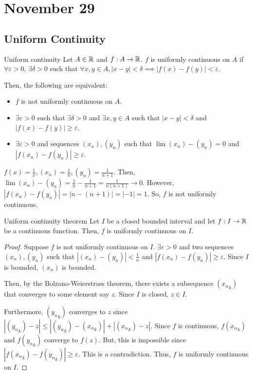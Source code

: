 \chapter{November 29}

\section{Uniform Continuity}
\begin{definition}{Uniform continuity}{}
    Let $A \in \mathbb{R}$ and $f: A \to \mathbb{R}$. $f$ is uniformly continuous on $A$ if $\forall \varepsilon > 0$, $\exists \delta > 0$ such that $\forall x, y \in A, |x - y| < \delta \implies |f(x) - f(y)| < \varepsilon$.
\end{definition}

\noindent Then, the following are equivalent:
\begin{itemize}
    \item $f$ is not uniformly continuous on $A$.
    \item $\exists \varepsilon > 0$ such that $\exists \delta > 0$ and $\exists x, y \in A$ such that $|x - y| < \delta$ and $|f(x) - f(y)| \geq \varepsilon$.
    \item $\exists \varepsilon > 0$ and sequences $(x_n), (y_n)$ such that $\lim (x_n) - (y_n) = 0$ and $|f(x_n) - f(y_n)| \geq \varepsilon$.
\end{itemize}
\begin{example}{}{}
    $f(x) = \frac{1}{x}, (x_n) = \frac{1}{n}, (y_n) = \frac{1}{n + 1}$. Then, $\lim (x_n) - (y_n) = \frac{1}{n} - \frac{1}{n + 1} = \frac{1}{n(n + 1)} \to 0$. However, $|f(x_n) - f(y_n)| = |n - (n + 1)| = |-1| = 1$. So, $f$ is not uniformly continuous.
\end{example}

\begin{theorem}{Uniform continuity theorem}{}
    Let $I$ be a closed bounded interval and let $f: I \to \mathbb{R}$ be a continuous function. Then, $f$ is uniformly continuous on $I$.
\end{theorem}
\begin{proof}
    Suppose $f$ is not uniformly continuous on $I$. $\exists \varepsilon > 0$ and two sequences $(x_n), (y_n)$ such that $|(x_n) - (y_n)| < \frac{1}{n}$ and $|f(x_n) - f(y_n)| \geq \varepsilon$. Since $I$ is bounded, $(x_n)$ is bounded. 
    
    Then, by the Bolzano-Weierstrass theorem, there exists a subsequence $({x_n}_k)$ that converges to some element say $z$. Since $I$ is closed, $z \in I$. 
    
    Furthermore, $({y_n}_k)$ converges to $z$ since $|({y_n}_k) - z| \leq |({y_n}_k) - ({x_n}_k)| + |({x_n}_k) - z|$. Since $f$ is continuous, $f({x_n}_k)$ and $f({y_n}_k)$ converge to $f(z)$. But, this is impossible since $|f({x_n}_k) - f({y_n}_k)| \geq \varepsilon$. This is a contradiction. Thus, $f$ is uniformly continuous on $I$.
\end{proof}